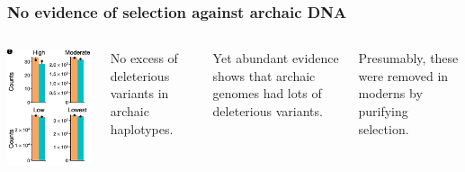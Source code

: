 \documentclass[pdftex,12pt]{beamer}
\begin{document}
\begin{frame}
  \frametitle{No evidence of selection against archaic DNA}
  \begin{columns}
    \includegraphics[width=\linewidth]{noseln.png}
    \raggedleft

    No excess of deleterious variants in archaic haplotypes.

    \bigskip

    Yet abundant evidence shows that archaic genomes had lots of
    deleterious variants.

    \bigskip

    Presumably, these were removed in moderns by purifying selection.
  \end{columns}

\end{frame}
\end{document}

